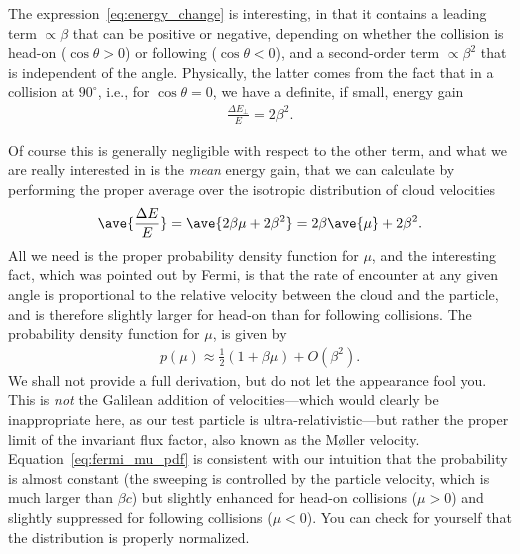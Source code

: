 The expression~\eqref{eq:energy_change} is interesting, in that it contains a leading
term $\propto \beta$ that can be positive or negative, depending on whether the
collision is head-on ($\cos\theta > 0$) or following ($\cos\theta < 0$), and a
second-order term $\propto \beta^2$ that is independent of the angle.  Physically,
the latter comes from the fact that in a collision at $90^\circ$, i.e., for
$\cos\theta = 0$, we have a definite, if small, energy gain
\begin{align*}
  \frac{\Delta E_\perp}{E} = 2\beta^2.
\end{align*}

Of course this is generally negligible with respect to the other term, and what we
are really interested in is the \emph{mean} energy gain, that we can calculate by
performing the proper average over the isotropic distribution of cloud velocities
\begin{align*}
  \ave{\frac{\Delta E}{E}} = \ave{2\beta \mu + 2\beta^2} = 2\beta \ave{\mu} + 2\beta^2.
\end{align*}
All we need is the proper probability density function for $\mu$, and the interesting
fact, which was pointed out by Fermi, is that the rate of encounter at any given angle
is proportional to the relative velocity between the cloud and the particle, and is
therefore slightly larger for head-on than for following collisions. The probability density function for $\mu$, is
given by
\begin{align}\label{eq:fermi_mu_pdf}
  p(\mu) \approx \frac{1}{2} (1 + \beta \mu)  + O(\beta^2).
\end{align}
We shall not provide a full derivation, but do not let the appearance fool you.
This is \emph{not} the Galilean addition of velocities---which would clearly be
inappropriate here, as our test particle is ultra-relativistic---but rather the
proper limit of the invariant flux factor, also known as the Møller velocity.
Equation~\eqref{eq:fermi_mu_pdf} is consistent with our intuition that the
probability is almost constant (the sweeping is controlled by the particle velocity,
which is much larger than $\beta c$) but slightly enhanced for head-on collisions
($\mu > 0$) and slightly suppressed for following collisions ($\mu < 0$). You can
check for yourself that the distribution is properly normalized.

